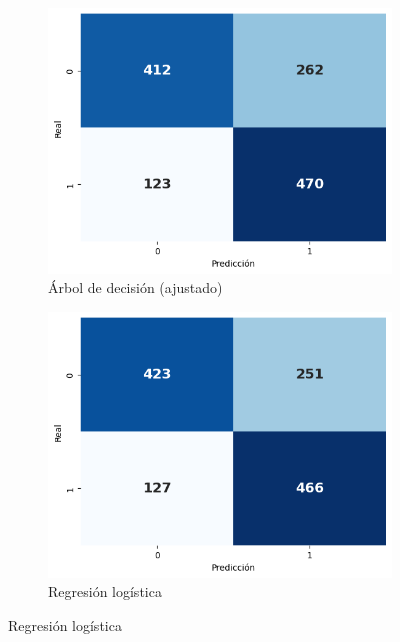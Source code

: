 \begin{figure}[h]
  \centering
  \begin{subfigure}[t]{0.32\linewidth}
    \centering
    \includegraphics[width=\linewidth]{figures/decision_tree_tuned_cm.png}
    \caption{Árbol de decisión (ajustado)}
    \label{fig:cm-tree}
  \end{subfigure}\hfill
  \begin{subfigure}[t]{0.32\linewidth}
    \centering
    \includegraphics[width=\linewidth]{figures/logistic_cm.png}
    \caption{Regresión logística}
    \label{fig:cm-log}
  \end{subfigure}\hfill

\end{figure}
